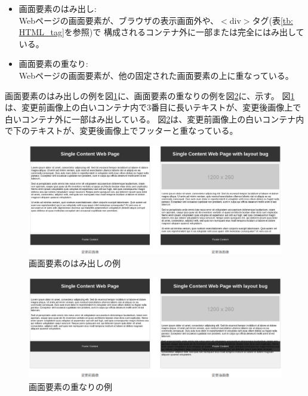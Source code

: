 \begin{itemize}
      \setlength{\itemsep}{0pt}
            \setlength{\parsep}{0pt}
      \item 画面要素のはみ出し:\\
            Webページの画面要素が、ブラウザの表示画面外や、$<$div$>$タグ(表\ref{tb: HTML_tag}を参照)で
            構成されるコンテナ外に一部または完全にはみ出している。                 
      \item 画面要素の重なり:\\
            Webページの画面要素が、他の固定された画面要素の上に重なっている。
\end{itemize}
画面要素のはみ出しの例を図\ref{fig:hamidasi}に、画面要素の重なりの例を図\ref{fig:overlap}に、示す。
図\ref{fig:hamidasi}は、変更前画像上の白いコンテナ内で3番目に長いテキストが、変更後画像上で白いコンテナ外に一部はみ出している。
図\ref{fig:overlap}は、変更前画像上の白いコンテナ内で下のテキストが、変更後画像上でフッターと重なっている。
\begin{figure}[tp]
      \begin{center}
            \includegraphics[width=1.0\columnwidth]{image/2/hamidasi.png}
            \caption{画面要素のはみ出しの例}
            \label{fig:hamidasi}
      \end{center}
\end{figure}
\begin{figure}[tp]
      \begin{center}
            \includegraphics[width=1.0\columnwidth]{image/2/overlap.png}
            \caption{画面要素の重なりの例}
            \label{fig:overlap}
      \end{center}
\end{figure}
